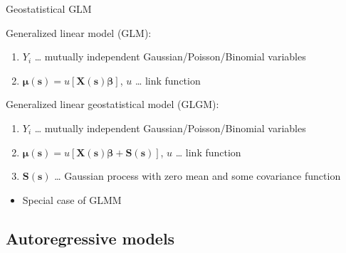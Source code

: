 \documentclass[
  ignorenonframetext,
]{beamer}
\providecommand{\tightlist}{%
  \setlength{\itemsep}{0pt}\setlength{\parskip}{0pt}}
\begin{document}
\begin{frame}{Geostatistical GLM}
\small

Generalized linear model (GLM):

\begin{enumerate}
\tightlist
\item
  \(Y_i\) \ldots{} mutually independent Gaussian/Poisson/Binomial
  variables
\item
  \(\boldsymbol{\mu(\boldsymbol{s})} = u[\boldsymbol{X}(\boldsymbol{s})\boldsymbol{\beta}]\),
  \(u\) \ldots{} link function
\end{enumerate}

Generalized linear geostatistical model (GLGM):

\begin{enumerate}
\tightlist
\item
  \(Y_i\) \ldots{} mutually independent Gaussian/Poisson/Binomial
  variables
\item
  \(\boldsymbol{\mu(\boldsymbol{s})} = u[\boldsymbol{X}(\boldsymbol{s})\boldsymbol{\beta} + \boldsymbol{S}(\boldsymbol{s})]\),
  \(u\) \ldots{} link function
\item
  \(\boldsymbol{S}(\boldsymbol{s})\) \ldots{} Gaussian process with zero
  mean and some covariance function
\end{enumerate}

\begin{itemize}
\tightlist
\item
  Special case of GLMM
\end{itemize}
\end{frame}

\hypertarget{autoregressive-models}{%
\subsection{Autoregressive models}\label{autoregressive-models}}
\end{document}
